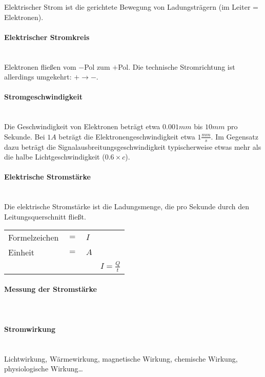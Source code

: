 \noindent Elektrischer Strom ist die gerichtete Bewegung von Ladungsträgern (im Leiter = Elektronen).

		\paragraph{Elektrischer Stromkreis}~\\
		
\noindent Elektronen fließen vom $-$Pol zum $+$Pol. Die technische Stromrichtung ist allerdings umgekehrt: $+ \to -$.		
		
		\paragraph{Stromgeschwindigkeit}~\\
		
\noindent Die Geschwindigkeit von Elektronen beträgt etwa $0.001mm$ bis $10mm$ pro Sekunde. Bei $1A$ beträgt die Elektronengeschwindigkeit etwa $1\frac{mm}{s}$. Im Gegensatz dazu beträgt die Signalausbreitungsgeschwindigkeit typischerweise etwas mehr als die halbe Lichtgeschwindigkeit ($0.6\times c$).
	
		\paragraph{Elektrische Stromstärke}~\\
		
\noindent Die elektrische Stromstärke ist die Ladungsmenge, die pro Sekunde durch den Leitungsquerschnitt fließt.

\begin{tabular}{llll}
Formelzeichen	& $=$ & $I$ &\\
Einheit			& $=$ & $A$ &\\
& & & $I = \frac{Q}{t}$\\
\end{tabular}	
		
		\paragraph{Messung der Stromstärke}~\\
		\paragraph{Stromwirkung}~\\
		
\noindent Lichtwirkung, Wärmewirkung, magnetische Wirkung, chemische Wirkung, physiologische Wirkung\dots		
		
